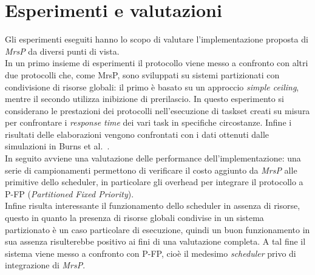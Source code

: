 











\section{Esperimenti e valutazioni}
\label{sec:esperimenti}

\noindent Gli esperimenti eseguiti hanno lo scopo di valutare l'implementazione proposta di \emph{MrsP} da diversi punti di vista.\\

\noindent In un primo insieme di esperimenti il protocollo viene messo a confronto con altri due protocolli che, come MrsP, sono sviluppati su sistemi partizionati con condivisione di risorse globali: il primo è basato su un approccio \textit{simple ceiling}, mentre il secondo utilizza inibizione di prerilascio. In questo esperimento si considerano le prestazioni dei protocolli nell'esecuzione di taskset creati su misura per confrontare i \textit{response time} dei vari task in specifiche circostanze. Infine i risultati delle elaborazioni vengono confrontati con i dati ottenuti dalle simulazioni in Burns et al.~\cite{Burns:2013:SCM:2547348.2547350}.\\

\noindent In seguito avviene una valutazione delle performance dell'implementazione: una serie di campionamenti permettono di verificare il costo aggiunto da \textit{MrsP} alle primitive dello scheduler, in particolare gli overhead per integrare il protocollo a P-FP (\textit{Partitioned Fixed Priority}).\\

\noindent Infine risulta interessante il funzionamento dello scheduler in assenza di risorse, questo in quanto la presenza di risorse globali condivise in un sistema partizionato è un caso particolare di esecuzione, quindi un buon funzionamento in sua assenza risulterebbe positivo ai fini di una valutazione completa. A tal fine il sistema viene messo a confronto con P-FP, cioè il medesimo \textit{scheduler} privo di integrazione di \textit{MrsP}.\\

